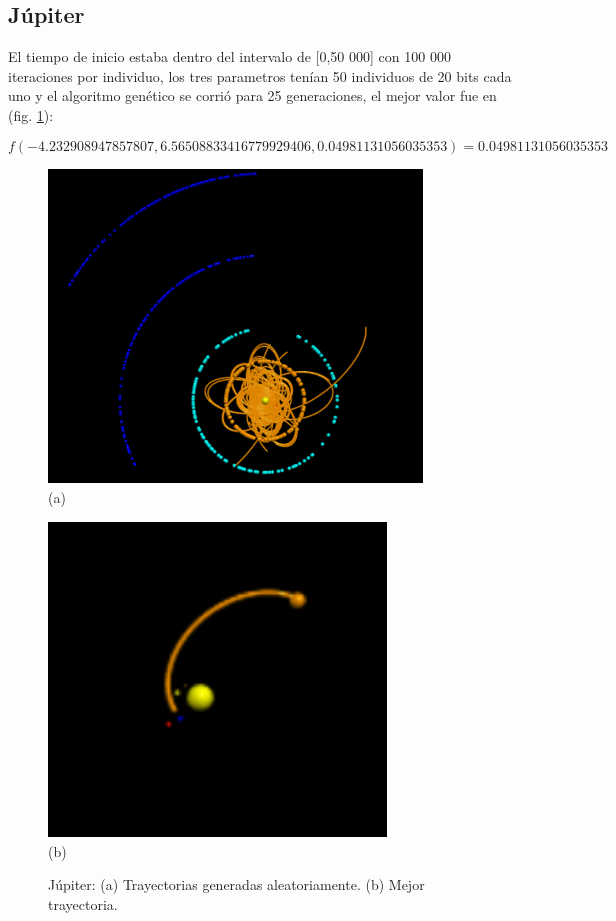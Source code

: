 \documentclass[12pt,letterpaper]{article}
\begin{document}
\subsection*{Júpiter}

El tiempo de inicio estaba dentro del intervalo de [0,50 000] con 100 000 iteraciones por individuo, los tres parametros tenían 50 individuos de 20 bits cada uno y el algoritmo genético se corrió para 25 generaciones, el mejor valor fue en (fig. \ref{fig:jupiter}):

\[
f(-4.232908947857807, 6.565088334167799 29406, 0.04981131056035353) = 0.04981131056035353
\]

\begin{figure}[H]
\centering
  \begin{minipage}{0.3\textwidth}
    \centering
    \includegraphics[width=0.885\textwidth]{Jupiter}\\
    {\small (a)} 
  \end{minipage}%
  \hspace{1mm}
  \begin{minipage}{0.3\textwidth}
    \centering
    \includegraphics[width=0.8\textwidth]{JupiterFinal}\\
    {\small (b)} 
  \end{minipage}
  \caption{Júpiter: (a) Trayectorias generadas aleatoriamente. (b) Mejor trayectoria.}
  \label{fig:jupiter}
\end{figure}
\end{document}
